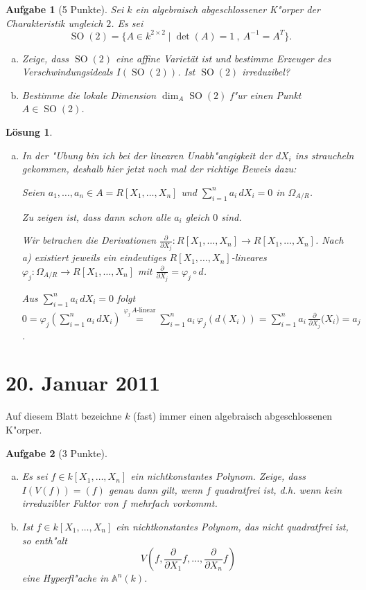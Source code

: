 \documentclass[a4paper, 12pt, numbers=noendperiod, chapterprefix=true, headsepline]{scrbook}
\theoremstyle{break}
\newtheorem{Aufg}{Aufgabe}
\newtheorem{Loes}{L\"osung}
\theoremstyle{nonumberbreak}
\theoremstyle{nonumberplain}
\newcommand{\set}[2]{\{#1\mid #2\}} %
\newcommand{\pder}[2][]{\frac{\partial #1}{\partial #2}}  %
\DeclareMathOperator{\SO}{SO}
\newcommand{\A}{\mathbb{A}}
\begin{document}
\begin{Aufg}[5 Punkte]
Sei $k$ ein algebraisch abgeschlossener K"orper der Charakteristik ungleich $2$. Es sei
	\[\SO(2) = \set{A \in k^{2\times 2}}{\det(A) = 1\ ,\ A^{-1} = A^T}.\]
\begin{enumerate}[a)]
	\item Zeige, dass $\SO(2)$ eine affine Variet\"at ist und bestimme Erzeuger des Verschwindungsideals $I(\SO(2))$. Ist $\SO(2)$ irreduzibel?
	\item Bestimme die lokale Dimension $\dim_A \SO(2)$ f"ur einen Punkt $A\in \SO(2)$.
\end{enumerate}\end{Aufg}

\begin{Loes}\begin{enumerate}[a)]\item[b)]
In der "Ubung bin ich bei der linearen Unabh"angigkeit der $dX_i$ ins straucheln gekommen, deshalb hier jetzt noch mal der richtige Beweis dazu:

Seien $a_1, \dots, a_n \in A = R[X_1, \dots, X_n]$ und $\sum_{i=1}^n a_i \, dX_i = 0$ in $\Omega_{A/R}$.

Zu zeigen ist, dass dann schon alle $a_i$ gleich $0$ sind.

Wir betrachen die Derivationen $\pder{X_j}{} \colon R[X_1, \dots, X_n] \to R[X_1, \dots, X_n]$. Nach a) existiert jeweils ein eindeutiges $R[X_1, \dots, X_n]$-lineares $\varphi_j \colon \Omega_{A/R} \to R[X_1, \dots, X_n]$ mit $\pder{X_j}{} = \varphi_j \circ d$.

Aus $\sum_{i=1}^n a_i \, dX_i = 0$ folgt $0 = \varphi_j(\sum_{i=1}^n a_i \, dX_i) \stackrel{\varphi_j \,  A\textrm{-linear}}{=} \sum_{i=1}^n a_i \, \varphi_j(d(X_i)) = \sum_{i=1}^n a_i \, \pder{X_j}{(X_i}) = a_j$.
\end{enumerate}\end{Loes}

\newpage
\section{20. Januar 2011}
\setcounter{Aufg}{0}
\setcounter{Loes}{1}

Auf diesem Blatt bezeichne $k$ (fast) immer einen algebraisch abgeschlossenen K"orper.

\begin{Aufg}[3 Punkte]
\begin{enumerate}[a)]
	\item Es sei $f\in k[X_1,\dots,X_n]$ ein nichtkonstantes Polynom. Zeige, dass $I(V(f)) = (f)$ genau dann gilt, wenn $f$ quadratfrei ist, d.h. wenn kein irreduzibler Faktor von $f$ mehrfach vorkommt.
	\item Ist $f\in k[X_1,\dots,X_n]$ ein nichtkonstantes Polynom, das nicht quadratfrei ist, so enth"alt
		\[V\left(f, \pder{X_1}{f},\dots, \pder{X_n}{f}\right)\]
	eine Hyperfl"ache in $\A^n(k)$.
\end{enumerate}\end{Aufg}
\end{document}
